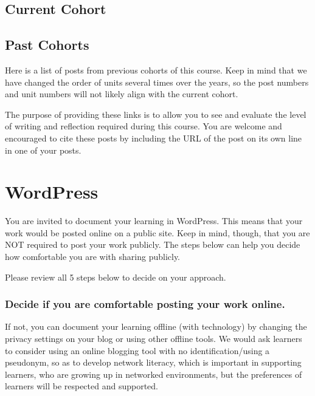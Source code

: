 \documentclass[
]{book}
\begin{document}
\hypertarget{current-cohort}{%
\section*{Current Cohort}\label{current-cohort}}

\hypertarget{past-cohorts}{%
\section*{Past Cohorts}\label{past-cohorts}}

Here is a list of posts from previous cohorts of this course. Keep in mind that we have changed the order of units several times over the years, so the post numbers and unit numbers will not likely align with the current cohort.

The purpose of providing these links is to allow you to see and evaluate the level of writing and reflection required during this course. You are welcome and encouraged to cite these posts by including the URL of the post on its own line in one of your posts.

\hypertarget{wordpress}{%
\chapter*{WordPress}\label{wordpress}}

You are invited to document your learning in WordPress. This means that your work would be posted online on a public site. Keep in mind, though, that you are NOT required to post your work publicly. The steps below can help you decide how comfortable you are with sharing publicly.

Please review all 5 steps below to decide on your approach.

\hypertarget{decide-if-you-are-comfortable-posting-your-work-online.}{%
\subsection*{Decide if you are comfortable posting your work online.}\label{decide-if-you-are-comfortable-posting-your-work-online.}}

If not, you can document your learning offline (with technology) by changing the privacy settings on your blog or using other offline tools. We would ask learners to consider using an online blogging tool with no identification/using a pseudonym, so as to develop network literacy, which is important in supporting learners, who are growing up in networked environments, but the preferences of learners will be respected and supported.
\end{document}
